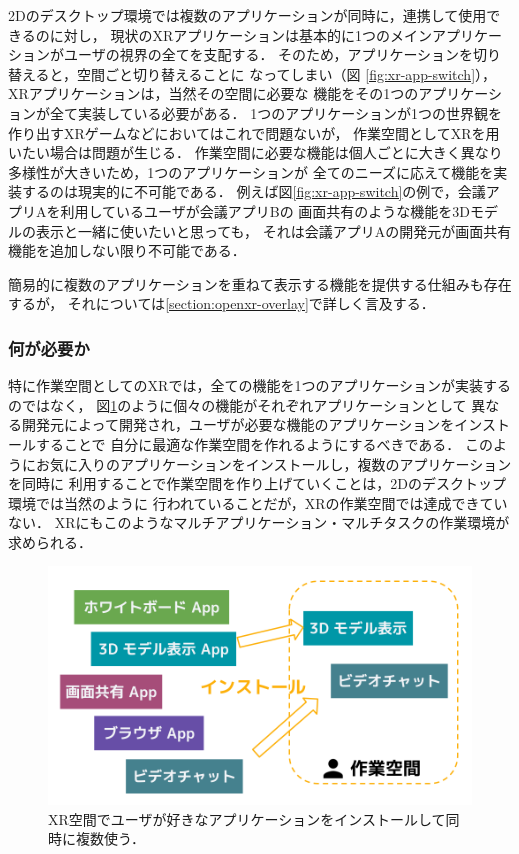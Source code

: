 2Dのデスクトップ環境では複数のアプリケーションが同時に，連携して使用できるのに対し，
現状のXRアプリケーションは基本的に1つのメインアプリケーションがユーザの視界の全てを支配する．
そのため，アプリケーションを切り替えると，空間ごと切り替えることに
なってしまい（図 \ref{fig:xr-app-switch}），XRアプリケーションは，当然その空間に必要な
機能をその1つのアプリケーションが全て実装している必要がある．
1つのアプリケーションが1つの世界観を作り出すXRゲームなどにおいてはこれで問題ないが，
作業空間としてXRを用いたい場合は問題が生じる．
作業空間に必要な機能は個人ごとに大きく異なり多様性が大きいため，1つのアプリケーションが
全てのニーズに応えて機能を実装するのは現実的に不可能である．
例えば図\ref{fig:xr-app-switch}の例で，会議アプリAを利用しているユーザが会議アプリBの
画面共有のような機能を3Dモデルの表示と一緒に使いたいと思っても，
それは会議アプリAの開発元が画面共有機能を追加しない限り不可能である．

簡易的に複数のアプリケーションを重ねて表示する機能を提供する仕組みも存在するが，
それについては\ref{section:openxr-overlay}で詳しく言及する．

\subsubsection{何が必要か}

特に作業空間としてのXRでは，全ての機能を1つのアプリケーションが実装するのではなく，
図\ref{fig:xr-app-install}のように個々の機能がそれぞれアプリケーションとして
異なる開発元によって開発され，ユーザが必要な機能のアプリケーションをインストールすることで
自分に最適な作業空間を作れるようにするべきである．
このようにお気に入りのアプリケーションをインストールし，複数のアプリケーションを同時に
利用することで作業空間を作り上げていくことは，2Dのデスクトップ環境では当然のように
行われていることだが，XRの作業空間では達成できていない．
XRにもこのようなマルチアプリケーション・マルチタスクの作業環境が求められる．

\begin{figure}[htbp]
  \begin{minipage}[t]{0.50\linewidth}
    \centering
    \includegraphics[keepaspectratio, width=\linewidth]{fig/xr-app-install.png}
    \caption{XR空間でユーザが好きなアプリケーションをインストールして同時に複数使う．}
    \label{fig:xr-app-install}
  \end{minipage}
\end{figure}
